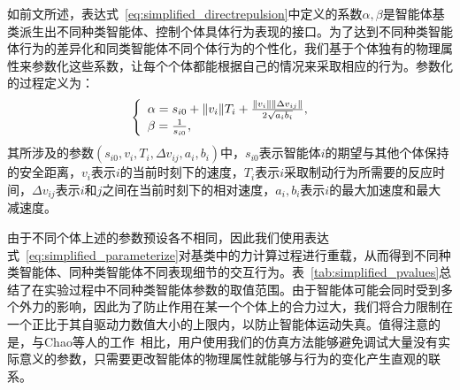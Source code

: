 如前文所述，表达式~\ref{eq:simplified_directrepulsion}中定义的系数$\alpha, \beta$是智能体基类派生出不同种类智能体、控制个体具体行为表现的接口。为了达到不同种类智能体行为的差异化和同类智能体不同个体行为的个性化，我们基于个体独有的物理属性来参数化这些系数，让每个个体都能根据自己的情况来采取相应的行为。参数化的过程定义为：
\begin{equation}
\setlength\abovedisplayskip{6pt}
\setlength\belowdisplayskip{6pt}
\label{eq:simplified_parameterize}
    \left\{
        \begin{array}{lr}
        \alpha = s_{i0} + \|v_i\| T_i + \frac{\|v_i\| \|\Delta v_{ij}\|}{2\sqrt{a_i b_i}}, & \\
        \beta = \frac{1}{s_{i0}},
        \end{array}
    \right.
\end{equation}
其所涉及的参数$(s_{i0}, v_i, T_i, \Delta v_{ij}, a_i, b_i)$中，$s_{i0}$表示智能体$i$的期望与其他个体保持的安全距离，$v_i$表示$i$的当前时刻下的速度，$T_i$表示$i$采取制动行为所需要的反应时间，$\Delta v_{ij}$表示$i$和$j$之间在当前时刻下的相对速度，$a_i, b_i$表示$i$的最大加速度和最大减速度。


由于不同个体上述的参数预设各不相同，因此我们使用表达式~\ref{eq:simplified_parameterize}对基类中的力计算过程进行重载，从而得到不同种类智能体、同种类智能体不同表现细节的交互行为。表~\ref{tab:simplified_pvalues}总结了在实验过程中不同种类智能体参数的取值范围。由于智能体可能会同时受到多个外力的影响，因此为了防止作用在某一个个体上的合力过大，我们将合力限制在一个正比于其自驱动力数值大小的上限内，以防止智能体运动失真。值得注意的是，与Chao等人的工作~\cite{chao2019force}相比，用户使用我们的仿真方法能够避免调试大量没有实际意义的参数，只需要更改智能体的物理属性就能够与行为的变化产生直观的联系。

